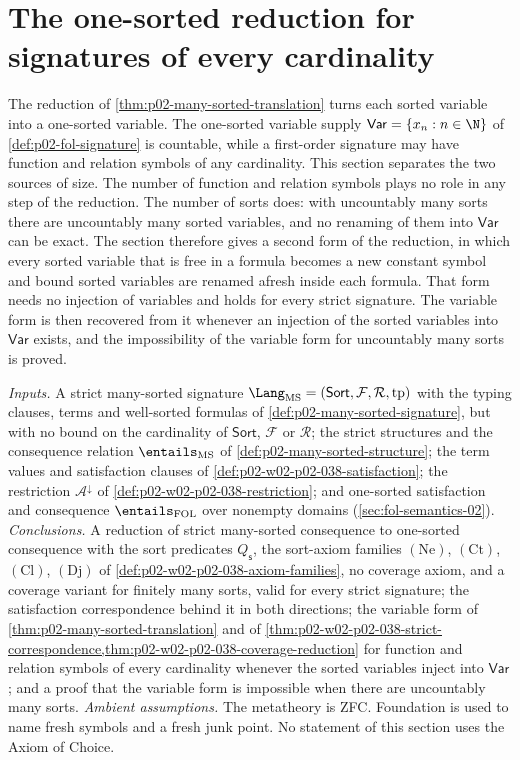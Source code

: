 \section{The one-sorted reduction for signatures of every cardinality}
\label{sec:p02-w02b-p02-033-any-cardinality}

The reduction of \cref{thm:p02-many-sorted-translation} turns each sorted
variable into a one-sorted variable.  The one-sorted variable supply
\(\mathsf{Var}=\{x_n:n\in\N\}\) of \cref{def:p02-fol-signature} is countable,
while a first-order signature may have function and relation symbols of any
cardinality.  This section separates the two sources of size.  The number of
function and relation symbols plays no role in any step of the reduction.  The
number of sorts does: with uncountably many sorts there are uncountably many
sorted variables, and no renaming of them into \(\mathsf{Var}\) can be exact.
The section therefore gives a second form of the reduction, in which every
sorted variable that is free in a formula becomes a new constant symbol and
bound sorted variables are renamed afresh inside each formula.  That form
needs no injection of variables and holds for every strict signature.  The
variable form is then recovered from it whenever an injection of the sorted
variables into \(\mathsf{Var}\) exists, and the impossibility of the variable
form for uncountably many sorts is proved.

\emph{Inputs.}  A strict many-sorted signature
\(\Lang_{\mathrm{MS}}=(\mathsf{Sort},\mathcal F,\mathcal R,\operatorname{tp})\)
with the typing clauses, terms and well-sorted formulas of
\cref{def:p02-many-sorted-signature}, but with no bound on the cardinality of
\(\mathsf{Sort}\), \(\mathcal F\) or \(\mathcal R\); the strict structures and
the consequence relation \(\entails_{\mathrm{MS}}\) of
\cref{def:p02-many-sorted-structure}; the term values and satisfaction clauses
of \cref{def:p02-w02-p02-038-satisfaction}; the restriction
\(\mathcal A^{\downarrow}\) of \cref{def:p02-w02-p02-038-restriction}; and
one-sorted satisfaction and consequence \(\entails_{\mathrm{FOL}}\) over
nonempty domains (\cref{sec:fol-semantics-02}).  \emph{Conclusions.}  A
reduction of strict many-sorted consequence to one-sorted consequence with the
sort predicates \(Q_{\mathsf s}\), the sort-axiom families
\((\mathrm{Ne})\), \((\mathrm{Ct})\), \((\mathrm{Cl})\), \((\mathrm{Dj})\) of
\cref{def:p02-w02-p02-038-axiom-families}, no coverage axiom, and a coverage
variant for finitely many sorts, valid for every strict signature; the
satisfaction correspondence behind it in both directions; the variable form of
\cref{thm:p02-many-sorted-translation} and of
\cref{thm:p02-w02-p02-038-strict-correspondence,thm:p02-w02-p02-038-coverage-reduction}
for function and relation symbols of every cardinality whenever the sorted
variables inject into \(\mathsf{Var}\); and a proof that the variable form is
impossible when there are uncountably many sorts.  \emph{Ambient
assumptions.}  The metatheory is ZFC.  Foundation is used to name fresh
symbols and a fresh junk point.  No statement of this section uses the Axiom
of Choice.


